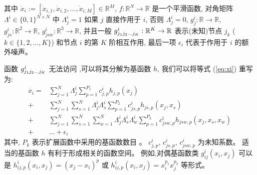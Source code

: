 其中 $\dot{x}_i :=[\dot{x}_{i,1}, \dot{x}_{i,2},\ldots,\dot{x}_{i,M}]\in \mathbb{R}^M$,
$f:\mathbb{R}^N \to \mathbb{R}$ 是一个平滑函数, 
对角矩阵 $\Lambda^i \in \{0,1\}^{N \times N}$ 中 $\Lambda^i_{j}=1$ 如果 $j$ 直接作用于 $i$, 
否则 $\Lambda^i_{j}=0$, $g^i_j:\mathbb{R} \to \mathbb{R}$, $g^i_{js}:\mathbb{R}^2 \to \mathbb{R}$, $g^i_{jsw}:\mathbb{R}^3 \to \mathbb{R}$,
并且一般 $g^i_{j_{1}j_{2}\ldots\\j_{K}}:\mathbb{R}^K \to \mathbb{R}$ 表示(未知)节点 $j_k$ ($k \in \{1,2,\ldots,K\}$) 和节点 $i$ 的第 $K$ 阶相互作用, 
最后一项 $\epsilon_{i}$ 代表于作用于 $i$ 的额外噪声。

函数 $g^i_{j_{1}j_{2}\ldots\\j_{K}}$ 无法访问 \cite{casadiego2017model},可以将其分解为基函数 $h$,
我们可以将等式 (\ref{eq:xi}) 重写为:
\begin{equation}
\label{eq:xi_with_h}
\begin{split}
\dot{x_i} =  &\sum_{j=1}^{N} \Lambda^i_{j} \sum_{p=1}^{P_1} c^i_{j,p}h_{j,p}(x_j) \\
+ &  \sum_{j=1}^{N} \sum_{s=1}^{N}\Lambda^i_{j}\Lambda^i_{s} \sum_{p=1}^{P_2} c^i_{js,p}h_{js,p}(x_j,x_s) \\
                             + &\sum_{j=1}^{N} \sum_{s=1}^{N} \sum_{w=1}^{N}\Lambda^i_{j}\Lambda^i_{s}\Lambda^i_{w} \sum_{p=1}^{P_3} c^i_{jsw,p}h_{jsw,p}(x_j,x_s,x_w)\\
                             + &\ldots + \epsilon_{i} 
\end{split}
\end{equation}
其中, $P_k$ 表示扩展函数中采用的基函数数目 \cite{friedman2001elements}。
$c^i_{j,p}$, $c^i_{js,p}$, $c^i_{jsw,p}$ 为未知系数。
适当的基函数 $h$ 有利于形成相关的函数空间。
例如,对偶基函数类 $g^i_{ij}(x_i,x_j)$ 可以是 $h^i_{ij,p}(x_i,x_j)=(x_j-x_i)^p$ 或 $h^i_{ij,p}(x_i,x_j)=x^{p_{1}}_i x^{p_{2}}_j$ 等形式。

